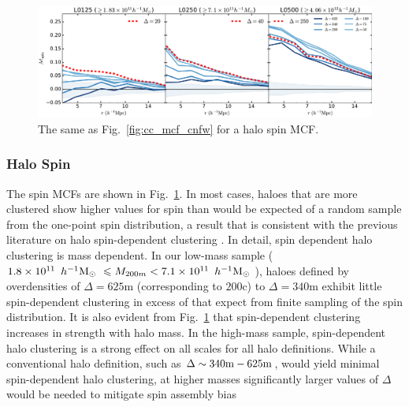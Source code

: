 \documentclass[usenatbib,fleqn]{mnras}
\begin{document}
\begin{figure}
	\centering
	\includegraphics[width=\textwidth]{all_mcf_spin.pdf}
	\caption{
The same as Fig.~\ref{fig:cc_mcf_cnfw} for a halo spin MCF.
}
	\label{fig:cc_mcf_spin}
\end{figure}

\subsubsection{Halo Spin}

The spin MCFs are shown in Fig.~\ref{fig:cc_mcf_spin}. In most cases, haloes that are more clustered show higher values for spin than would be expected of a random sample from the one-point spin distribution, a result that is consistent with the previous literature on halo spin-dependent clustering \citep{bett_etal07,faltenbacher_white10,lacerna_padilla12}. In detail, spin dependent halo clustering is mass dependent. In our low-mass sample ($1.8 \times 10^{11}\, \ h^{-1}\mathrm{M}_{\odot}~ \leqslant M_{200m} < 7.1 \times 10^{11}\, \ h^{-1}\mathrm{M}_{\odot}~$), haloes defined by overdensities of $\Delta=625$m (corresponding to $200$c) to $\Delta=340$m exhibit little spin-dependent clustering in excess of that expect from finite sampling of the spin distribution. It is also evident from Fig.~\ref{fig:cc_mcf_spin} that spin-dependent clustering increases in strength with halo mass. In the high-mass sample, spin-dependent halo clustering is a strong effect on all scales for all halo definitions. While a conventional halo definition, such as $\Delta \sim 340{\rm m}-625{\rm m}$, would yield minimal spin-dependent halo clustering, at higher masses significantly larger values of $\Delta$ would be needed to mitigate spin assembly bias\citep{hahn_etal07a,hahn_etal07b,faltenbacher_white10}
\end{document}
